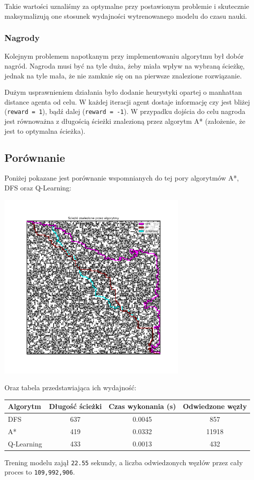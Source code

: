 \documentclass[a4paper,12pt]{article}
\begin{document}
    Takie wartości uznaliśmy za optymalne przy postawionym problemie i skutecznie maksymalizują one stosunek wydajności wytrenowanego modelu do czasu nauki.

    \subsubsection{Nagrody}
    Kolejnym problemem napotkanym przy implementowaniu  algorytmu był dobór nagród.
    Nagroda musi być na tyle duża, żeby miała wpływ na wybraną ścieżkę, jednak na tyle mała, że nie zamknie się on na pierwsze znalezione rozwiązanie.
    
    Dużym usprawnieniem działania było dodanie heurystyki opartej o manhattan distance agenta od celu.
    W każdej iteracji agent dostaje informację czy jest bliżej (\texttt{reward = 1}), bądź dalej (\texttt{reward = -1}).
    W przypadku dojścia do celu nagroda jest równoważna z długością ścieżki znalezioną przez algorytm A* (założenie, że jest to optymalna ścieżka).

    
    \subsection{Porównanie}
	Poniżej pokazane jest porównanie wspomnianych do tej pory algorytmów A*, DFS oraz Q-Learning:
    \begin{center}
        \includegraphics[width=0.7\textwidth]{images/qlearning-vs-others.png}    
    \end{center}

    Oraz tabela przedstawiająca ich wydajność:
    \begin{table}[h!]
\centering
\begin{tabular}{|l|c|c|c|}
\hline
\textbf{Algorytm} & \textbf{Długość ścieżki} & \textbf{Czas wykonania (s)} & \textbf{Odwiedzone węzły} \\
\hline
DFS        & 637  & 0.0045  & 857    \\
A*         & 419  & 0.0332  & 11918  \\
Q-Learning & 433  & 0.0013  & 432    \\
\hline
\end{tabular}
\end{table}

    Trening modelu zajął \texttt{22.55} sekundy, a liczba odwiedzonych węzłów przez cały proces to \texttt{109,992,906}.


\end{document}
